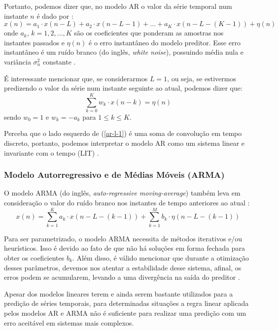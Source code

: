 \documentclass[a4paper, 12pt]{article}
\begin{document}
Portanto, podemos dizer que, no modelo AR o valor da série temporal num instante $n$ é dado por \cite{haykin2008adaptive}:
\begin{equation}
x(n) = a_{1} \cdot x(n - L) + a_{2} \cdot x(n - L - 1) + ... + a_{K} \cdot x(n - L - (K - 1)) + \eta (n)
\end{equation}
onde $a_{k}$, $k = 1, 2, ..., K$ são os coeficientes que ponderam as amostras nos instantes passados e $\eta (n)$ é o erro instantâneo do modelo preditor. Esse erro instantâneo é um ruído branco (do inglês, \textit{white noise}), possuindo média nula e variância $\sigma_{n}^2$ constante \cite{box2015time}.

É interessante mencionar que, se considerarmos $L = 1$, ou seja, se estivermos predizendo o valor da série num instante seguinte ao atual, podemos dizer que:
\begin{equation}\label{ar-l-1}
\sum_{k=0}^{K} w_{k} \cdot x(n - k) = \eta (n)
\end{equation}
sendo $w_{0} = 1$ e $w_{k} = -a_{k}$ para $1 \leq k \leq K$.

Perceba que o lado esquerdo de (\ref{ar-l-1}) é uma soma de convolução em tempo discreto, portanto, podemos interpretar o modelo AR como um sistema linear e invariante com o tempo (LIT) \cite{oppenheim2014signals}.

\subsubsection{Modelo Autorregressivo e de Médias Móveis (ARMA)}

O modelo ARMA (do inglês, \textit{auto-regressive moving-average}) também leva em consideração o valor do ruído branco nos instantes de tempo anteriores ao atual \cite{box2015time}:
\begin{equation}
x(n) = \sum_{k = 1}^{K} a_{k} \cdot x(n - L - (k-1)) + \sum_{k=1}^{M} b_{k} \cdot \eta(n - L - (k-1))
\end{equation} 

Para ser parametrizado, o modelo ARMA necessita de métodos iterativos e/ou heurísticos. Isso é devido ao fato de que não há soluções em forma fechada para obter os coeficientes $b_k$. Além disso, é válido mencionar que durante a otimização desses parâmetros, devemos nos atentar a estabilidade desse sistema, afinal, os erros podem se acumularem, levando a uma divergência na saída do preditor \cite{box2015time}.

Apesar dos modelos lineares terem e ainda serem bastante utilizados para a predição de séries temporais, para determinadas situações a regra linear aplicada pelos modelos AR e ARMA não é suficiente para realizar uma predição com um erro aceitável em sistemas mais complexos. 
\end{document}

